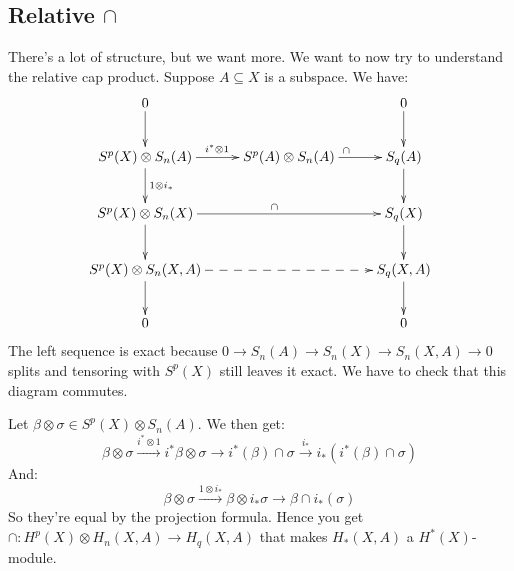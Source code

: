 \subsection{Relative $\cap$}
There's a lot of structure, but we want more. We want to now try to understand the relative cap product. Suppose $A\subseteq X$ is a subspace. We have:
\begin{equation*}
\xymatrix{
	0\ar[d] & & 0\ar[d]\\
	S^p(X)\otimes S_n(A)\ar[d]^{1\otimes i_\ast}\ar[r]^{i^\ast\otimes 1} & S^p(A)\otimes S_n(A)\ar[r]^{\cap} & S_q(A)\ar[d]\\
	S^p(X)\otimes S_n(X)\ar[rr]^\cap\ar[d] & & S_q(X)\ar[d]\\
	S^p(X)\otimes S_n(X,A)\ar[d]\ar@{-->}[rr] & & S_q(X,A)\ar[d]\\
	0 & & 0
}
\end{equation*}
The left sequence is exact because $0\to S_n(A)\to S_n(X)\to S_n(X,A)\to 0$ splits and tensoring with $S^p(X)$ still leaves it exact. We have to check that this diagram commutes.

Let $\beta\otimes \sigma\in S^p(X)\otimes S_n(A)$. We then get:
\begin{equation*}
\beta\otimes\sigma\xrightarrow{i^\ast\otimes 1}i^\ast\beta\otimes\sigma\to i^\ast(\beta)\cap\sigma\xrightarrow{i_\ast}i_\ast(i^\ast(\beta)\cap\sigma)
\end{equation*}
And:
\begin{equation*}
\beta\otimes\sigma\xrightarrow{1\otimes i_\ast}\beta\otimes i_\ast\sigma\to \beta\cap i_\ast(\sigma)
\end{equation*}
So they're equal by the projection formula. Hence you get $\cap: H^p(X)\otimes H_n(X,A)\to H_q(X,A)$ that makes $ H_\ast(X,A)$ a $ H^\ast(X)$-module.
